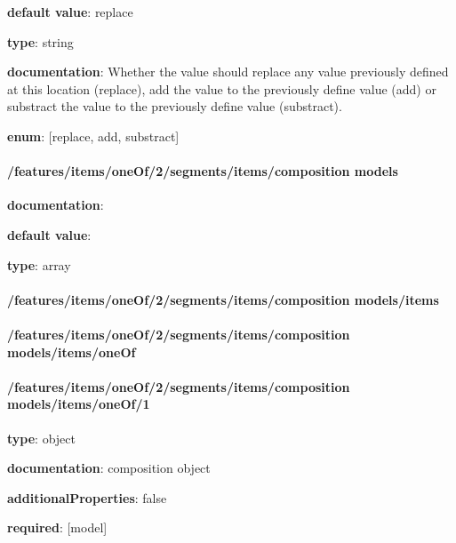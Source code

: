 \begin{itemized}
\item {\bf default value}: replace
\item {\bf type}: string
\item {\bf documentation}: Whether the value should replace any value previously defined at this location (replace), add the value to the previously define value (add) or substract the value to the previously define value (substract).
\item {\bf enum}: [replace, add, substract]\end{itemized}\paragraph{/features/items/oneOf/2/segments/items/composition models} \begin{itemized}
\item {\bf documentation}: 
\item {\bf default value}: 
\item {\bf type}: array
\paragraph{/features/items/oneOf/2/segments/items/composition models/items} \begin{itemized}
\end{itemized}\end{itemized}\paragraph{/features/items/oneOf/2/segments/items/composition models/items/oneOf} \begin{itemized}
\end{itemized}\paragraph{/features/items/oneOf/2/segments/items/composition models/items/oneOf/1} \begin{itemized}
\item {\bf type}: object
\item {\bf documentation}: composition object
\item {\bf additionalProperties}: false
\item {\bf required}: [model]\end{itemized}
